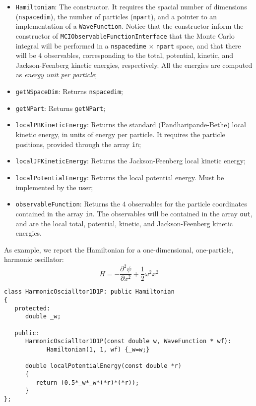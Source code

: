 \documentclass[11pt,a4paper,twoside]{article}
\begin{document}
\begin{itemize}
\item \verb+Hamiltonian+: The constructor. It requires the spacial number of dimensions (\verb+nspacedim+), the number of particles (\verb+npart+), and a pointer to an implementation of a \verb+WaveFunction+. Notice that the constructor inform the constructor of \verb+MCIObservableFunctionInterface+ that the Monte Carlo integral will be performed in a \verb+nspacedime+ $\times$ \verb+npart+ space, and that there will be $4$ observables, corresponding to the total, potential, kinetic, and Jackson-Feenberg kinetic energies, respectively. All the energies are computed as \emph{energy unit per particle};
\item \verb+getNSpaceDim+: Returns \verb+nspacedim+;
\item \verb+getNPart+: Returns \verb+getNPart+;
\item \verb+localPBKineticEnergy+: Returns the standard (Pandharipande-Bethe) local kinetic energy, in units of energy per particle. It requires the particle positions, provided through the array \verb+in+;
\item \verb+localJFKineticEnergy+: Returns the Jackson-Feenberg local kinetic energy;
\item \verb+localPotentialEnergy+: Returns the local potential energy. Must be implemented by the user;
\item \verb+observableFunction+: Returns the $4$ observables for the particle coordinates contained in the array \verb+in+. The observables will be contained in the array \verb+out+, and are the local total, potential, kinetic, and Jackson-Feenberg kinetic energies.
\end{itemize}

As example, we report the Hamiltonian for a one-dimensional, one-particle, harmonic oscillator:
\begin{equation}
  H = - \frac{\partial^2 \psi}{\partial x^2} + \frac{1}{2} \omega^2 x^2
\end{equation}

\begin{lstlisting}
class HarmonicOscialltor1D1P: public Hamiltonian
{
   protected:
      double _w;

   public:
      HarmonicOscialltor1D1P(const double w, WaveFunction * wf):
            Hamiltonian(1, 1, wf) {_w=w;}

      double localPotentialEnergy(const double *r)
      {
         return (0.5*_w*_w*(*r)*(*r));
      }
};
\end{lstlisting}
\end{document}

